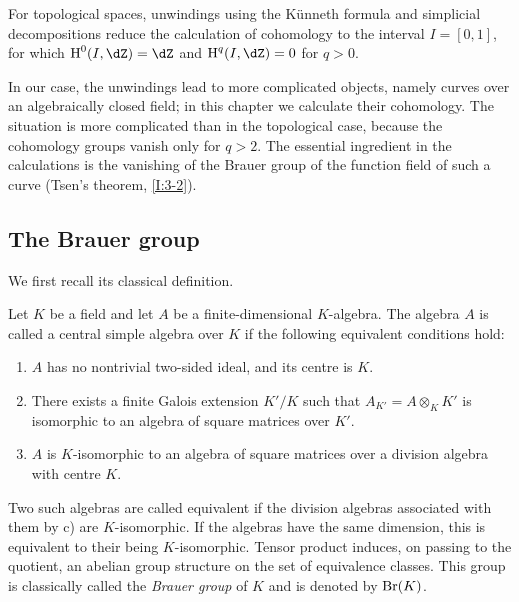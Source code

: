 For topological spaces, unwindings using the K\"unneth formula and
simplicial decompositions reduce the calculation of cohomology to the
interval $I=[0,1]$, for which $\h^0(I,\dZ)=\dZ$ and
$\h^q(I,\dZ)=0$ for $q>0$.

In our case, the unwindings lead to more complicated objects, namely curves
over an algebraically closed field; in this chapter we calculate their
cohomology. The situation is more complicated than in the topological case,
because the cohomology groups vanish only for $q>2$. The essential
ingredient in the calculations is the vanishing of the Brauer group of the
function field of such a curve (Tsen's theorem, \ref{I:3-2}).

\subsection{The Brauer group}\label{I:3-1}

We first recall its classical definition.

\begin{definition}\label{I:3-1-1}
Let $K$ be a field and let $A$ be a finite-dimensional $K$-algebra. The
algebra $A$ is called a central simple algebra over $K$ if the following
equivalent conditions hold:
\begin{enumerate}[\indent a)]
  \item $A$ has no nontrivial two-sided ideal, and its centre is $K$.
  \item There exists a finite Galois extension $K'/K$ such that
    $A_{K'}=A\otimes_KK'$ is isomorphic to an algebra of square matrices
    over $K'$.
  \item $A$ is $K$-isomorphic to an algebra of square matrices over a
    division algebra with centre $K$.
\end{enumerate}
\end{definition}

Two such algebras are called equivalent if the division algebras associated
with them by c) are $K$-isomorphic. If the algebras have the same
dimension, this is equivalent to their being $K$-isomorphic. Tensor product
induces, on passing to the quotient, an abelian group structure on the set
of equivalence classes. This group is classically called the
\emph{Brauer group} of $K$ and is denoted by $\operatorname{Br}(K)$.

\subsubsection{}\label{I:3-1-2}

